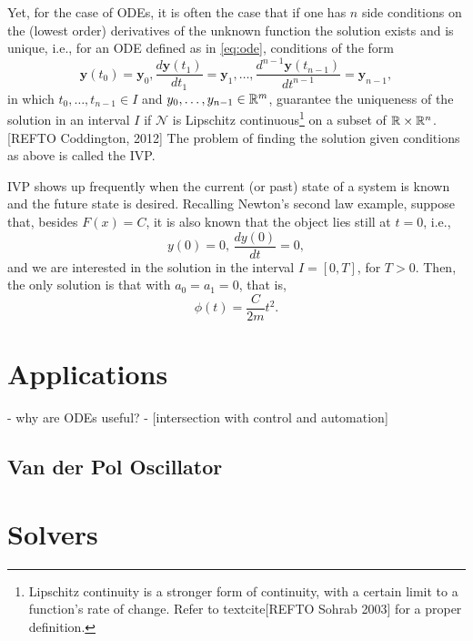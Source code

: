 Yet, for the case of ODEs, it is often the case that if one has $n$ side conditions on the (lowest order) derivatives of the unknown function the solution exists and is unique, i.e., for an ODE defined as in \eqref{eq:ode}, conditions of the form \[
\bm{y}\left( t_0 \right) =\bm{y}_0,\frac{d\bm{y}\left( t_1 \right) }{dt_1}=\bm{y}_1,\ldots,\frac{d^{n-1}\bm{y}\left( t_{n-1} \right) }{dt^{n-1}}= \bm{y}_{n-1}
,\] in which $t_0,\ldots,t_{n-1}\in I$ and $y_0,\ldots,y_{n-1}\in \mathbb{R}^m$, guarantee the uniqueness of the solution in an interval $I$ if $\mathcal{N}$ is Lipschitz continuous\footnote{Lipschitz continuity is a stronger form of continuity, with a certain limit to a function's rate of change. Refer to textcite[REFTO Sohrab 2003] for a proper definition.} on a subset of $\mathbb{R}\times \mathbb{R}^{n}$\footnotemark. [REFTO Coddington, 2012]
The problem of finding the solution given conditions as above is called the \gls{IVP}.

\gls{IVP} shows up frequently when the current (or past) state of a system is known and the future state is desired. Recalling Newton's second law example, suppose that, besides $F(x)=C$, it is also known that the object lies still at $t=0$, i.e., \[
y(0) = 0,\,\frac{d y(0)}{dt}=0
,\] and we are interested in the solution in the interval $I=\left[ 0,T \right] $, for $T>0$. Then, the only solution is that with $a_0=a_1=0$, that is, \[
    \phi\left( t \right) = \frac{C}{2m}t^2
.\] 

\section{Applications}

- why are ODEs useful?
- [intersection with control and automation] 

\subsection{Van der Pol Oscillator}

\section{Solvers}

